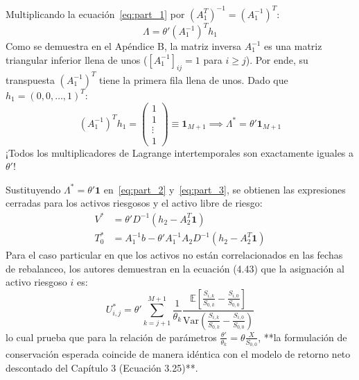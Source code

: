 \documentclass[11pt,a4paper]{report}
\numberwithin{equation}{chapter}
\begin{document}
\begin{demobox}[Deducción del Vector de Multiplicadores $\Lambda = \theta' \mathbf{1}$]
Multiplicando la ecuación~\eqref{eq:part_1} por $(A_1^T)^{-1} = (A_1^{-1})^T$:
\begin{equation}
    \Lambda = \theta' (A_1^{-1})^T h_1
\end{equation}
Como se demuestra en el Apéndice B, la matriz inversa $A_1^{-1}$ es una matriz triangular inferior llena de unos ($[A_1^{-1}]_{ij} = 1$ para $i \ge j$). Por ende, su transpuesta $(A_1^{-1})^T$ tiene la primera fila llena de unos. Dado que $h_1 = (0, 0, \dots, 1)^T$:
\begin{equation}
    (A_1^{-1})^T h_1 = \begin{pmatrix} 1 \\ 1 \\ \vdots \\ 1 \end{pmatrix} \equiv \mathbf{1}_{M+1} \implies \boxed{\Lambda^* = \theta' \mathbf{1}_{M+1}}
\end{equation}
¡Todos los multiplicadores de Lagrange intertemporales son exactamente iguales a $\theta'$!
\end{demobox}

Sustituyendo $\Lambda^* = \theta' \mathbf{1}$ en~\eqref{eq:part_2} y~\eqref{eq:part_3}, se obtienen las expresiones cerradas para los activos riesgosos y el activo libre de riesgo:
\begin{align}
    V^* &= \theta' D^{-1} (h_2 - A_2^T \mathbf{1}) \\
    T_0^* &= A_1^{-1} b - \theta' A_1^{-1} A_2 D^{-1} (h_2 - A_2^T \mathbf{1})
\end{align}
Para el caso particular en que los activos no están correlacionados en las fechas de rebalanceo, los autores demuestran en la ecuación (4.43) que la asignación al activo riesgoso $i$ es:
\begin{equation}
    \boxed{U_{i,j}^* = \theta' \sum_{k=j+1}^{M+1} \frac{1}{\theta_k} \frac{\mathbb{E}\left[ \frac{S_{i,k}}{S_{0,k}} - \frac{S_{i,0}}{S_{0,0}} \right]}{\mathrm{Var}\left( \frac{S_{i,k}}{S_{0,k}} - \frac{S_{i,0}}{S_{0,0}} \right)}}
\end{equation}
lo cual prueba que para la relación de parámetros $\frac{\theta'}{\theta_k} = \theta \frac{X}{S_{0,0}}$, **la formulación de conservación esperada coincide de manera idéntica con el modelo de retorno neto descontado del Capítulo 3 (Ecuación 3.25)**.

\end{document}
